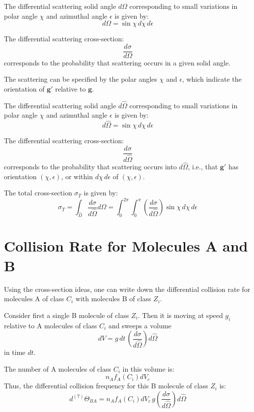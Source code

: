 \documentclass{article}
\begin{document}
The differential scattering solid angle \( d\Omega \) corresponding to small variations in polar angle \( \chi \) and azimuthal angle \( \epsilon \) is given by:
\[
d\Omega = \sin \chi \, d\chi \, d\epsilon
\]

The differential scattering cross-section:
\[
\frac{d\sigma}{d\Omega}
\]
corresponds to the probability that scattering occurs in a given solid angle.


The scattering can be specified by the polar angles \( \chi \) and \( \epsilon \), which indicate the orientation of \( \mathbf{g}' \) relative to \( \mathbf{g} \).

The differential scattering solid angle \( d\hat{\Omega} \) corresponding to small variations in polar angle \( \chi \) and azimuthal angle \( \epsilon \) is given by:
\[
d\hat{\Omega} = \sin \chi \, d\chi \, d\epsilon
\]

The differential scattering cross-section:
\[
\frac{d\sigma}{d\hat{\Omega}}
\]
corresponds to the probability that scattering occurs into \( d\hat{\Omega} \), i.e., that \( \mathbf{g}' \) has orientation \( (\chi, \epsilon) \), or within \( d\chi \, d\epsilon \) of \( (\chi, \epsilon) \).

The total cross-section \( \sigma_T \) is given by:
\[
\sigma_T = \int_{\hat{\Omega}} \frac{d\sigma}{d\hat{\Omega}} d\hat{\Omega}
= \int_0^{2\pi} \int_0^{\pi} \left( \frac{d\sigma}{d\hat{\Omega}} \right) \sin \chi \, d\chi \, d\epsilon
\]


\section*{Collision Rate for Molecules A and B}

Using the cross-section ideas, one can write down the differential collision rate for molecules A of class \( C_i \) with molecules B of class \( Z_i \).

Consider first a single B molecule of class \( Z_i \). Then it is moving at speed \( g_i \) relative to A molecules of class \( C_i \) and sweeps a volume
\[
dV = g \, dt \, \left( \frac{d\sigma}{d\hat{\Omega}} \right) d\hat{\Omega}
\]
in time \( dt \).

The number of A molecules of class \( C_i \) in this volume is:
\[
n_A f_A(C_i) dV_c
\]
Thus, the differential collision frequency for this B molecule of class \( Z_i \) is:
\[
d^{(7)}\Theta_{BA} = n_A f_A(C_i) dV_c \, g \left( \frac{d\sigma}{d\hat{\Omega}} \right) d\hat{\Omega}
\]
\end{document}
